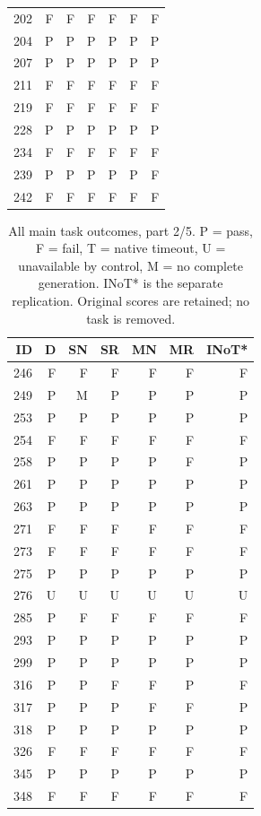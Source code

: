 \begin{table}[!htbp]
\begin{tabular*}{\textwidth}{@{\extracolsep{\fill}}rrrrrrr}
202 & F & F & F & F & F & F\\
204 & P & P & P & P & P & P\\
207 & P & P & P & P & P & P\\
211 & F & F & F & F & F & F\\
219 & F & F & F & F & F & F\\
228 & P & P & P & P & P & P\\
234 & F & F & F & F & F & F\\
239 & P & P & P & P & P & F\\
242 & F & F & F & F & F & F\\
\bottomrule\end{tabular*}\end{table}
\clearpage
\begin{table}[!htbp]\centering\footnotesize
\caption{All main task outcomes, part 2/5. P = pass, F = fail, T = native timeout, U = unavailable by control, M = no complete generation. INoT* is the separate replication. Original scores are retained; no task is removed.}
\begin{tabular*}{\textwidth}{@{\extracolsep{\fill}}rrrrrrr}\toprule
ID & D & SN & SR & MN & MR & INoT*\\\midrule
246 & F & F & F & F & F & F\\
249 & P & M & P & P & P & P\\
253 & P & P & P & P & P & P\\
254 & F & F & F & F & F & F\\
258 & P & P & P & P & F & P\\
261 & P & P & P & P & P & P\\
263 & P & P & P & P & P & P\\
271 & F & F & F & F & F & F\\
273 & F & F & F & F & F & F\\
275 & P & P & P & P & P & P\\
276 & U & U & U & U & U & U\\
285 & P & F & F & F & F & F\\
293 & P & P & P & P & P & P\\
299 & P & P & P & P & P & P\\
316 & P & P & F & F & P & F\\
317 & P & P & P & F & F & P\\
318 & P & P & P & P & P & P\\
326 & F & F & F & F & F & F\\
345 & P & P & P & P & P & P\\
348 & F & F & F & F & F & F\\

\end{tabular*}
\end{table}
